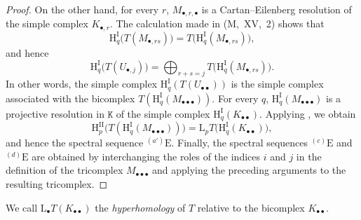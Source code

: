 \documentclass[oneside]{amsart}
\theoremstyle{ega-env-style}
\theoremstyle{ega-thm-env-style}
\theoremstyle{ega-defn-env-style}
\def\cat{\mathtt}                   %
\def\HH{\mathrm{H}}                 %
\def\LL{\mathrm{L}}                 %
\begin{document}
\begin{proof}
On the other hand, for every $r$, $M_{\bullet,r,\bullet}$ is a
Cartan--Eilenberg resolution of the simple complex $K_{\bullet,r}$.
The calculation made in (M,~XV,~2) shows that
\[
  \HH^{\mathrm{I}}_q\bigl(T(M_{\bullet,rs})\bigr)
  =
  T\bigl(\HH^{\mathrm{I}}_q(M_{\bullet,rs})\bigr),
\]
and hence
\[
  \HH^{\mathrm{I}}_q\bigl(T(U_{\bullet,j})\bigr)
  =
  \bigoplus_{r+s=j}
  T\bigl(\HH^{\mathrm{I}}_q(M_{\bullet,rs})\bigr).
\]
In other words, the simple complex
$\HH^{\mathrm{I}}_q(T(U_{\bullet\bullet}))$ is the simple complex
associated with the bicomplex
$T(\HH^{\mathrm{I}}_q(M_{\bullet\bullet\bullet}))$.
For every $q$, $\HH^{\mathrm{I}}_q(M_{\bullet\bullet\bullet})$ is a
projective resolution in $\cat{K}$ of the simple complex
$\HH^{\mathrm{I}}_q(K_{\bullet\bullet})$.
Applying , we obtain
\[
  \HH^{\mathrm{II}}_p
  \bigl(T(\HH^{\mathrm{I}}_q(M_{\bullet\bullet\bullet}))\bigr)
  =
  \LL_pT\bigl(\HH^{\mathrm{I}}_q(K_{\bullet\bullet})\bigr),
\]
and hence the spectral sequence ${}^{(a')}\mathrm{E}$.
Finally, the spectral sequences ${}^{(c)}\mathrm{E}$ and
${}^{(d)}\mathrm{E}$ are obtained by interchanging the roles of the
indices $i$ and $j$ in the definition of the tricomplex
$M_{\bullet\bullet\bullet}$ and applying the preceding arguments to the
resulting tricomplex.
\end{proof}

We call $\LL_\bullet T(K_{\bullet\bullet})$ the \emph{hyperhomology} of
$T$ relative to the bicomplex $K_{\bullet\bullet}$.
\end{document}
